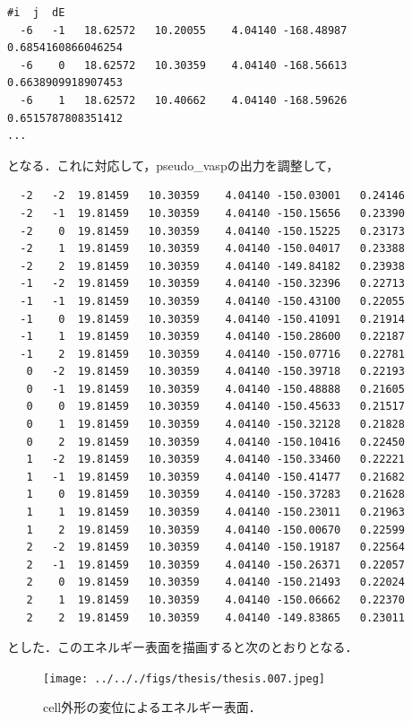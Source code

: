 \begin{verbatim}
#i  j  dE  
  -6   -1   18.62572   10.20055    4.04140 -168.48987 0.6854160866046254
  -6    0   18.62572   10.30359    4.04140 -168.56613 0.6638909918907453
  -6    1   18.62572   10.40662    4.04140 -168.59626 0.6515787808351412
...
\end{verbatim}

となる．これに対応して，pseudo\_vaspの出力を調整して，

\begin{verbatim}
  -2   -2  19.81459   10.30359    4.04140 -150.03001   0.24146     
  -2   -1  19.81459   10.30359    4.04140 -150.15656   0.23390     
  -2    0  19.81459   10.30359    4.04140 -150.15225   0.23173     
  -2    1  19.81459   10.30359    4.04140 -150.04017   0.23388     
  -2    2  19.81459   10.30359    4.04140 -149.84182   0.23938     
  -1   -2  19.81459   10.30359    4.04140 -150.32396   0.22713     
  -1   -1  19.81459   10.30359    4.04140 -150.43100   0.22055     
  -1    0  19.81459   10.30359    4.04140 -150.41091   0.21914     
  -1    1  19.81459   10.30359    4.04140 -150.28600   0.22187     
  -1    2  19.81459   10.30359    4.04140 -150.07716   0.22781     
   0   -2  19.81459   10.30359    4.04140 -150.39718   0.22193     
   0   -1  19.81459   10.30359    4.04140 -150.48888   0.21605     
   0    0  19.81459   10.30359    4.04140 -150.45633   0.21517     
   0    1  19.81459   10.30359    4.04140 -150.32128   0.21828     
   0    2  19.81459   10.30359    4.04140 -150.10416   0.22450     
   1   -2  19.81459   10.30359    4.04140 -150.33460   0.22221     
   1   -1  19.81459   10.30359    4.04140 -150.41477   0.21682     
   1    0  19.81459   10.30359    4.04140 -150.37283   0.21628     
   1    1  19.81459   10.30359    4.04140 -150.23011   0.21963     
   1    2  19.81459   10.30359    4.04140 -150.00670   0.22599     
   2   -2  19.81459   10.30359    4.04140 -150.19187   0.22564     
   2   -1  19.81459   10.30359    4.04140 -150.26371   0.22057     
   2    0  19.81459   10.30359    4.04140 -150.21493   0.22024     
   2    1  19.81459   10.30359    4.04140 -150.06662   0.22370     
   2    2  19.81459   10.30359    4.04140 -149.83865   0.23011
\end{verbatim}

とした．このエネルギー表面を描画すると次のとおりとなる．

\begin{figure}[H]
\centering
\begin{center}
\texttt{[image: ../.././figs/thesis/thesis.007.jpeg]}
\end{center}
\caption{cell外形の変位によるエネルギー表面．\label{spandata-label}}

\label{fig:}
\end{figure}

